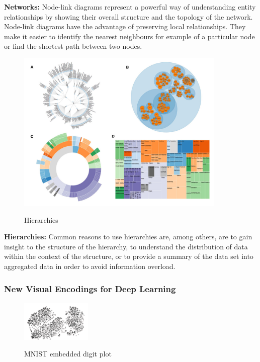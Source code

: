 \documentclass[a4paper,11pt,titlepage]{article}
\begin{document}
		\textbf{Networks:} Node-link diagrams represent a powerful way of understanding entity relationships by showing their overall structure and the topology of the network. Node-link diagrams have the advantage of preserving local relationships. They make it easier to identify the nearest neighbours for example of a particular node or find the shortest path between two nodes.
	
	\begin{figure}[H]
    			\centering	
			{{\includegraphics[width=10cm]
    				{img/rui_wang_hierarchies.png} 
    			}}%
    			\caption{Hierarchies}%
    		\label{fig:illinsky}
	\end{figure}

		\textbf{Hierarchies:} Common reasons to use hierarchies are, among others, are to gain insight to the structure of the hierarchy, to understand the distribution of data within the context of the structure, or to provide a summary of the data set into aggregated data in order to avoid information overload.
		
		\subsubsection{New Visual Encodings for Deep 	Learning}
 			
	\begin{figure}[H]
    			\centering	
			{{\includegraphics[width=0.3\textwidth]
    				{img/hinton_embedded_tsne.png} 
    			}}%
    			\caption{MNIST embedded digit plot}%
    		\label{fig:mnistHinton}
	\end{figure}
 		
\end{document}

